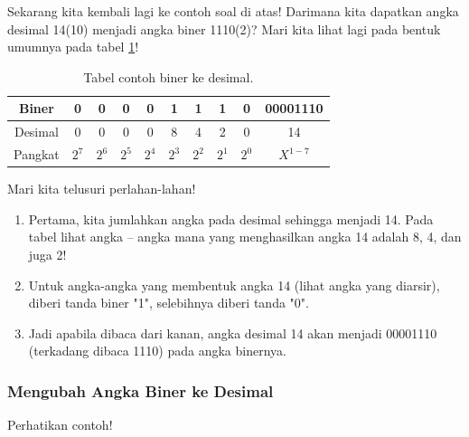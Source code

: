 Sekarang kita kembali lagi ke contoh soal di atas! Darimana kita dapatkan angka desimal 14(10) menjadi angka biner 1110(2)? 
Mari kita lihat lagi pada bentuk umumnya pada tabel \ref{table:contoh1}!

\begin{table}[h!]
\centering
\begin{tabular}{ |c|c|c|c|c|c|c|c|c|c| } 
\hline
Biner & 0 & 0 & 0 & 0 & 1 & 1 & 1 & 0 & 00001110 \\ 
\hline
Desimal & 0 & 0 & 0 & 0 & 8 & 4 & 2 & 0 & 14 \\ 
\hline
Pangkat & $2^7$ & $2^6$ & $2^5$ & $2^4$ & $2^3$ & $2^2$ & $2^1$ & $2^0$ & $X^{1-7}$ \\ 
\hline
\end{tabular}
\caption{Tabel contoh biner ke desimal.}
\label{table:contoh1}
\end{table}

\noindent Mari kita telusuri perlahan-lahan!

\begin{enumerate}[label=(\alph*)]
\item Pertama, kita jumlahkan angka pada desimal sehingga menjadi 14. Pada tabel lihat angka – angka mana yang menghasilkan angka 14 adalah 8, 4, dan juga 2!
\item Untuk angka-angka yang membentuk angka 14 (lihat angka yang diarsir), diberi tanda biner "1", selebihnya diberi tanda "0".
\item Jadi apabila dibaca dari kanan, angka desimal 14 akan menjadi 00001110 (terkadang dibaca 1110) pada angka binernya.
\end{enumerate}


\subsubsection{Mengubah Angka Biner ke Desimal}
Perhatikan contoh! 

